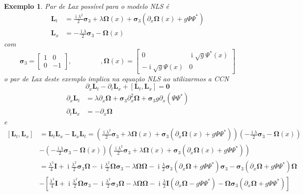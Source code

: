 \documentclass[25pt]{article}
\numberwithin{equation}{subsection} %
\DeclareMathOperator{\I}{i}
\newtheorem{expl}{Exemplo}
\newcommand{\commutador}[2]{\left[#1,#2\right]}
\newcommand{\OP}[1]{\mathbf{#1}}
\begin{document}
\begin{expl}
	Par de Lax possível para o modelo NLS é
	\begin{align*}
	\mathbf{L}_t&=\frac{\I\lambda^2}{2}\bm{\sigma}_3+\lambda\bm{\Omega}(x)+\bm{\sigma}_3\left(\partial_x\bm{\Omega}(x)+g\varPsi\varPsi^{*}\right)\\
	\mathbf{L}_x&=-\frac{\I\lambda}{2}\bm{\sigma}_3-\bm{\Omega}(x)
	\end{align*}
	com
	\begin{displaymath}
	\bm{\sigma}_3=\begin{bmatrix}
	1&0\\0&-1
	\end{bmatrix},~~~~~~~~~~~~~~~~~~~,\bm{\Omega}(x)=\begin{bmatrix}
	0&\I\sqrt{g}\varPsi^{*}(x)\\
	-\I\sqrt{g}\varPsi(x)&0
	\end{bmatrix}
	\end{displaymath}
	o par de Lax deste exemplo implica na equação NLS ao utilizarmos a CCN
	\begin{displaymath}
	\partial_x\mathbf{L}_t-\partial_t\mathbf{L}_x+\commutador{\mathbf{L}_t}{\mathbf{L}_x}=\mathbf{0}
	\end{displaymath}
	\begin{align}
	\partial_x\mathbf{L}_t&=\lambda \partial_x\bm{\Omega}+\bm{\sigma}_3\partial_x^2\bm{\Omega}+\bm{\sigma}_3g\partial_x\left(\varPsi\varPsi^{*}\right)\\
	\partial_t\mathbf{L}_x&=-\partial_x\bm{\Omega}
	\end{align}
	e
\begin{align}
\commutador{\OP{L}_t}{\OP{L}_x}&=\OP{L}_t\OP{L}_x-\OP{L}_x\OP{L}_t=\left(\frac{\I\lambda^2}{2}\bm{\sigma}_3+\lambda\bm{\Omega}(x)+\bm{\sigma}_3\left(\partial_x\bm{\Omega}(x)+g\Psi\Psi^{*}\right)\right)\left(
-\frac{\I\lambda}{2}\bm{\sigma}_3-\bm{\Omega}(x)\right)\\
&-\left(
-\frac{\I\lambda}{2}\bm{\sigma}_3-\bm{\Omega}(x)\right)\left(\frac{\I\lambda^2}{2}\bm{\sigma}_3+\lambda\bm{\Omega}(x)+\bm{\sigma}_3\left(\partial_x\bm{\Omega}(x)+g\Psi\Psi^{*}\right)\right)\\
&=\frac{\lambda^3}{4}\OP{I}+\I\frac{\lambda^2}{2}\bm{\sigma}_3\bm{\Omega}-\I\frac{\lambda^2}{2}\bm{\Omega}\bm{\sigma}_3-\lambda\bm{\Omega}\bm{\Omega}-\I\frac{\lambda}{2}\bm{\sigma}_3\left(\partial_x\bm{\Omega}+g\Psi\Psi^*\right)\bm{\sigma}_3-\bm{\sigma}_3\left(\partial_x\bm{\Omega}+g\Psi\Psi^*\right)\bm{\Omega}\\
&-\left[\frac{\lambda^3}{4}\OP{I}+\I\frac{\lambda^2}{2}\bm{\Omega}\bm{\sigma}_3-\I\frac{\lambda^2}{2}\bm{\sigma}_3\bm{\Omega}-\lambda\bm{\Omega}\bm{\Omega}-\I\frac{\lambda}{2}\OP{I}\left(\partial_x\bm{\Omega}-g\Psi\Psi^{*}\right)-\bm{\Omega}\bm{\sigma}_3\left(\partial_x\bm{\Omega}+g\Psi\Psi^{*}\right)\right]\\

\end{align}
\end{expl}
\end{document}
